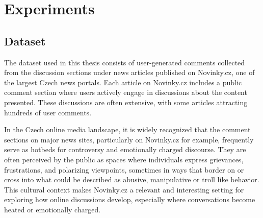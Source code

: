 \documentclass[twoside]{ctuthesis}
\theoremstyle{plain}
\theoremstyle{definition}
\theoremstyle{note}
\begin{document}





\chapter{Experiments}

\section{Dataset}
The dataset used in this thesis consists of user-generated comments collected from the discussion sections under news articles published on Novinky.cz, one of the largest Czech news portals. Each article on Novinky.cz includes a public comment section where users actively engage in discussions about the content presented. These discussions are often extensive, with some articles attracting hundreds of user comments.\par

In the Czech online media landscape, it is widely recognized that the comment sections on major news sites, particularly on Novinky.cz for example, frequently serve as hotbeds for controversy and emotionally charged discourse. They are often perceived by the public as spaces where individuals express grievances, frustrations, and polarizing viewpoints, sometimes in ways that border on or cross into what could be described as abusive, manipulative or troll like behavior. This cultural context makes Novinky.cz a relevant and interesting setting for exploring how online discussions develop, especially where conversations become heated or emotionally charged.\par
\end{document}
